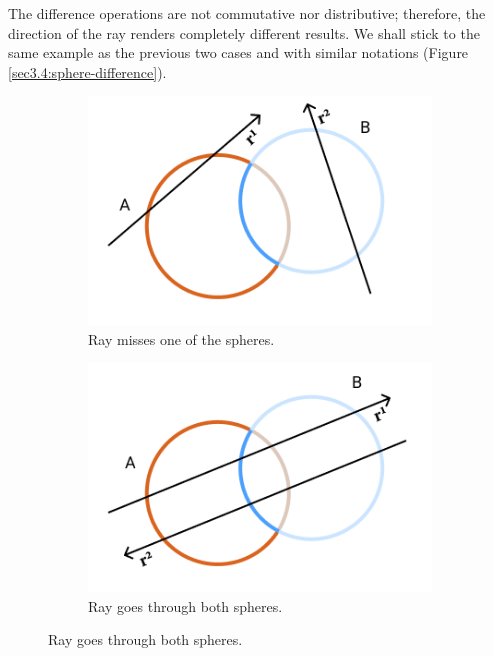 \documentclass[a4paper,11pt,oneside]{article}
\begin{document}
The difference operations are not commutative nor distributive; therefore, the direction of the ray renders completely different results. We shall stick to the same example as the previous two cases and with similar notations (Figure \ref{sec3.4:sphere-difference}).

\begin{figure}[ht]
	\centering
	\begin{subfigure}[b]{0.3\textwidth}
		\centering
		\includegraphics[width=\textwidth]{section4/4.1/difference-case-2.png}
		\caption{Ray misses one of the spheres.}
		\label{sec3.4:difference-case-1}
	\end{subfigure}
	\hfill
	\begin{subfigure}[b]{0.3\textwidth}
		\centering
		\includegraphics[width=\textwidth]{section4/4.1/difference-case-1.png}
		\caption{Ray goes through both spheres.}
		\label{sec3.4:difference-case-2}
	\end{subfigure}

\end{figure}
\end{document}
